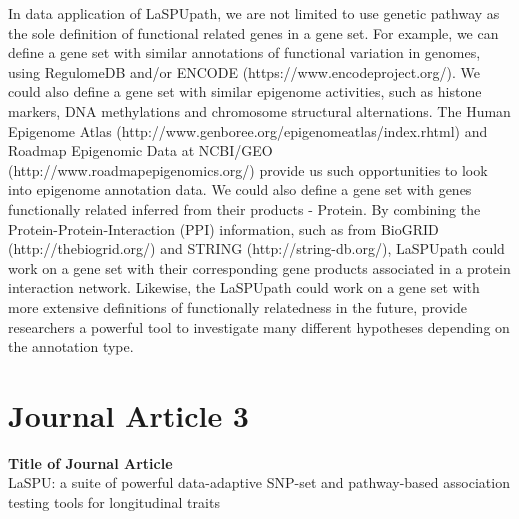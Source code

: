 \documentclass[12pt]{article}
\begin{document}
In data application of LaSPUpath, we are not limited to use genetic pathway as the sole definition of functional related genes in a gene set. For example, we can define a gene set with similar annotations of functional variation in genomes, using RegulomeDB\cite{Boyle2012} and/or ENCODE (https://www.encodeproject.org/). We could also define a gene set with similar epigenome activities, such as histone markers, DNA methylations and chromosome structural alternations. The Human Epigenome Atlas (http://www.genboree.org/epigenomeatlas/index.rhtml) and Roadmap Epigenomic Data at NCBI/GEO (http://www.roadmapepigenomics.org/) provide us such opportunities to look into epigenome annotation data. We could also define a gene set with genes functionally related inferred from their products - Protein. By combining the Protein-Protein-Interaction (PPI) information, such as from BioGRID (http://thebiogrid.org/) and STRING (http://string-db.org/), LaSPUpath could work on a gene set with their corresponding gene products associated in a protein interaction network. Likewise, the LaSPUpath could work on a gene set with more extensive definitions of functionally relatedness in the future, provide researchers a powerful tool to investigate many different hypotheses depending on the annotation type.


\newpage
\section{Journal Article 3}\label{JA_3}
\textbf{Title of Journal Article}\\
LaSPU: a suite of powerful data-adaptive SNP-set and pathway-based association testing tools for longitudinal traits\\\\
\end{document}
